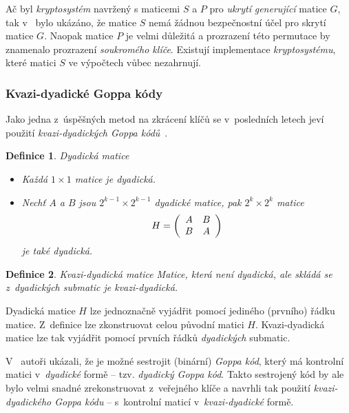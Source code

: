 \documentclass[thesis=M,czech,hidelinks]{FITthesis}[2012/06/26]
\newcommand{\0}{{\textcolor[gray]{0.80}{0}}}
\newtheorem{definice}{Definice}
\begin{document}
Ač byl \emph{kryptosystém} navržený s maticemi $S$ a $P$ pro \emph{ukrytí}
\emph{generující} matice $G$, tak v~\cite{Engelbert} bylo ukázáno, že matice $S$
nemá žádnou bezpečnostní účel pro skrytí matice $G$. Naopak matice $P$ je velmi
důležitá a prozrazení této permutace by znamenalo prozrazení \emph{soukromého
klíče}.
Existují implementace \emph{kryptosystému}, které matici $S$ ve výpočtech vůbec
nezahrnují.


\subsubsection{Kvazi-dyadické Goppa kódy}\label{kap_kvazi}
Jako jedna z~úspěšných metod na zkrácení klíčů se v~posledních letech jeví
použití \emph{kvazi-dyadických Goppa kódů}~\cite{Misoczki1}.

\begin{definice}{Dyadická matice}
    \begin{itemize}
        \item Každá $1\times1$ matice je \emph{dyadická}. \\
        \item Nechť $A$ a $B$ jsou $2^{k-1}\times2^{k-1}$ \emph{dyadické} matice, pak
            $2^k\times2^k$ matice
            $$H = \left(\begin{array}{c c}
                A & B\\
                B & A
            \end{array}\right)$$
            je také \emph{dyadická}.
    \end{itemize}
\end{definice}


\begin{definice}{Kvazi-dyadická matice}
    Matice, která není \emph{dyadická}, ale skládá se z~\emph{dyadických}
    submatic je \emph{kvazi-dyadická}.
\end{definice}

Dyadická matice $H$ lze jednoznačně vyjádřit pomocí jediného (prvního) řádku
matice. Z~definice lze zkonstruovat celou původní matici $H$. Kvazi-dyadická
matice lze tak vyjádřit pomocí prvních řádků \emph{dyadických} submatic.


V~\cite{Misoczki1} autoři ukázali, že je možné sestrojit (binární) \emph{Goppa
kód}, který má kontrolní matici v~\emph{dyadické} formě -- tzv. \emph{dyadický
Goppa kód}. Takto sestrojený kód by ale bylo velmi snadné zrekonstruovat
z~veřejného klíče a navrhli tak použití \emph{kvazi-dyadického Goppa kódu} --
s~kontrolní maticí v~\emph{kvazi-dyadické} formě.
\end{document}

